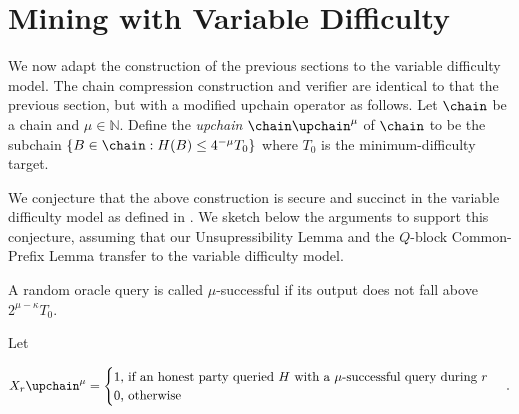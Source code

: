 \section{Mining with Variable Difficulty}\label{sec.variable}

We now adapt the construction of the previous sections to the variable
difficulty model.
%
The chain compression construction and verifier are identical to that the
previous section, but with a modified upchain operator as follows.
Let $\chain$ be a chain and $\mu \in \mathbb{N}$.
Define the \emph{upchain} $\chain\upchain^\mu$ of $\chain$ to be the
subchain $\{B \in \chain: H(B) \leq 4^{-\mu} T_0\}$ where
$T_0$ is the minimum-difficulty target.



We conjecture that the above construction is secure and succinct in the
variable difficulty model as defined in \cite{backbone}. We sketch below the
arguments to support this conjecture, assuming that our Unsupressibility Lemma
and the $Q$-block Common-Prefix Lemma transfer to the variable difficulty model.


\begin{definition}[Superqueries]
A random oracle query is called $\mu$-successful if
its output does not fall above $2^{\mu - \kappa} T_0$.
\end{definition}

Let

\begin{align*}
X_r\upchain^\mu = \begin{cases}
  1\text{, if an honest party queried $H$ with a $\mu$-successful query during $r$}\\
  0\text{, otherwise}
\end{cases}\,.
\end{align*}

